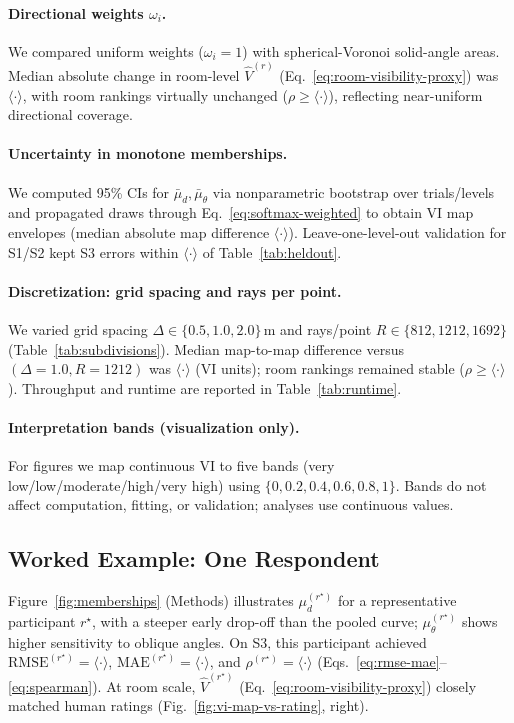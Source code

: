 \documentclass[final,3p,times,review]{elsarticle}
\begin{document}
\paragraph{Directional weights $\omega_i$.}
We compared uniform weights ($\omega_i{=}1$) with spherical-Voronoi solid-angle areas. Median absolute change in room-level $\widehat{V}^{(r)}$ (Eq.~\eqref{eq:room-visibility-proxy}) was $\langle\cdot\rangle$, with room rankings virtually unchanged ($\rho\ge\langle\cdot\rangle$), reflecting near-uniform directional coverage.

\paragraph{Uncertainty in monotone memberships.}
We computed 95\% CIs for $\bar{\mu}_d,\bar{\mu}_\theta$ via nonparametric bootstrap over trials/levels and propagated draws through Eq.~\eqref{eq:softmax-weighted} to obtain VI map envelopes (median absolute map difference $\langle\cdot\rangle$). Leave-one-level-out validation for S1/S2 kept S3 errors within $\langle\cdot\rangle$ of Table~\ref{tab:heldout}.

\paragraph{Discretization: grid spacing and rays per point.}
We varied grid spacing $\Delta\in\{0.5,1.0,2.0\}$\,m and rays/point $R\in\{812,1212,1692\}$ (Table~\ref{tab:subdivisions}). Median map-to-map difference versus $(\Delta{=}1.0,R{=}1212)$ was $\langle\cdot\rangle$ (VI units); room rankings remained stable ($\rho\ge\langle\cdot\rangle$). Throughput and runtime are reported in Table~\ref{tab:runtime}.

\paragraph{Interpretation bands (visualization only).}
For figures we map continuous $\mathrm{VI}$ to five bands (very low/low/moderate/high/very high) using $\{0,0.2,0.4,0.6,0.8,1\}$. Bands do not affect computation, fitting, or validation; analyses use continuous values.

\subsection{Worked Example: One Respondent}
Figure~\ref{fig:memberships} (Methods) illustrates $\mu_d^{(r^\star)}$ for a representative participant $r^\star$, with a steeper early drop-off than the pooled curve; $\mu_\theta^{(r^\star)}$ shows higher sensitivity to oblique angles. On S3, this participant achieved $\mathrm{RMSE}^{(r^\star)}{=}\langle \cdot \rangle$, $\mathrm{MAE}^{(r^\star)}{=}\langle \cdot \rangle$, and $\rho^{(r^\star)}{=}\langle \cdot \rangle$ (Eqs.~\ref{eq:rmse-mae}--\ref{eq:spearman}). At room scale, $\widehat{V}^{(r^\star)}$ (Eq.~\ref{eq:room-visibility-proxy}) closely matched human ratings (Fig.~\ref{fig:vi-map-vs-rating}, right).
\end{document}
